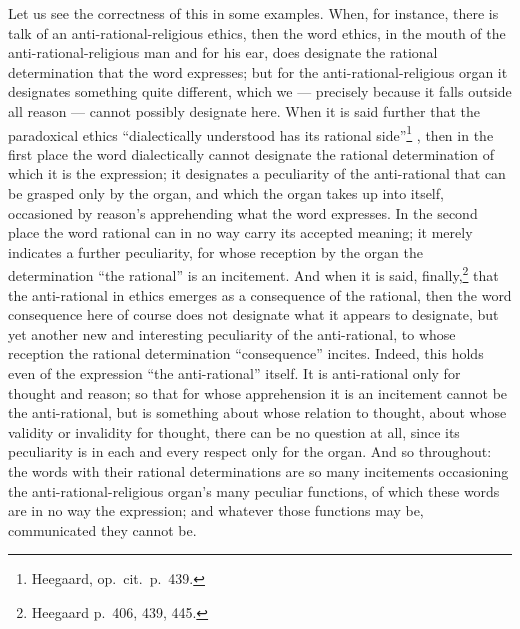 \documentclass[12pt,a4paper]{book}
\renewcommand{\thefootnote}{*)}
\newcommand{\fnmark}[2]{\renewcommand{\thefootnote}{#1}\footnote{#2}%
  \renewcommand{\thefootnote}{*)}}
\newcommand{\opage}[1]{\marginnote{\footnotesize\textit{[#1]}}}
\begin{document}
Let us see the correctness of this in some examples. When, for instance, there
is talk of an anti-rational-religious ethics, then the word ethics, in the mouth
of the anti-rational-religious man and for his ear, does designate the rational
determination that the word expresses; but for the anti-rational-religious
organ it designates something quite different, which we --- precisely because
it falls outside all reason --- cannot possibly designate here. When it is said
further that the paradoxical ethics ``dialectically understood has its rational
side''\fnmark{*)}{Heegaard, op.\ cit.\ p.\ 439.}, then in the first place the
word dialectically cannot designate the rational determination of which it is
the expression; it designates a peculiarity of the anti-rational that can be
grasped only by the organ, and which the organ
\opage{51}takes up into itself, occasioned by reason's apprehending what the
word expresses. In the second place the word rational can in no way carry its
accepted meaning; it merely indicates a further peculiarity, for whose reception
by the organ the determination ``the rational'' is an incitement. And when it
is said, finally,\fnmark{*)}{Heegaard p.\ 406, 439, 445.} that the anti-rational
in ethics emerges as a consequence of the rational, then the word consequence
here of course does not designate what it appears to designate, but yet another
new and interesting peculiarity of the anti-rational, to whose reception the
rational determination ``consequence'' incites. Indeed, this holds even of the
expression ``the anti-rational'' itself. It is anti-rational only for thought
and reason; so that for whose apprehension it is an incitement cannot be the
anti-rational, but is something about whose relation to thought, about whose
validity or invalidity for thought, there can be no question at all, since its
peculiarity is in each and every respect only for the organ. And so throughout:
the words with their rational determinations are so many incitements
occasioning the anti-rational-religious organ's many peculiar functions, of
which these words are in no way the expression; and whatever those functions
may be, communicated they cannot be.
\end{document}
